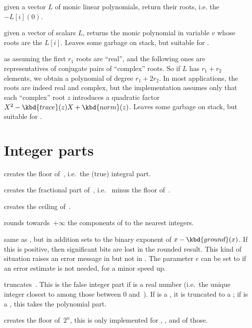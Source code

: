  given a vector $L$ of monic linear
polynomials, return their roots, i.e. the $- L[i](0)$.

 given a vector of scalars $L$,
returns the monic polynomial in variable $v$ whose roots are the $L[i]$.
Leaves some garbage on stack, but suitable for .

 as 
assuming the first $r_1$ roots are ``real'', and the following ones are
representatives of conjugate pairs of ``complex'' roots. So if $L$ has $r_1 +
r_2$ elements, we obtain a polynomial of degree $r_1 + 2r_2$. In most
applications, the roots are indeed real and complex, but the implementation
assumes only that each ``complex'' root $z$ introduces a quadratic
factor $X^2 - \kbd{trace}(z) X + \kbd{norm}(z)$.
Leaves some garbage on stack, but suitable for .

\section{Integer parts}

 creates the floor of~, i.e.\ the (true)
integral part.

 creates the fractional part of~, i.e.\ 
minus the floor of~.

 creates the ceiling of~.

 rounds towards~$+\infty$ the components of 
to the nearest integers.

 same as , but in addition sets
 to the binary exponent of $x - \kbd{ground}(x)$. If this is
positive, then significant bits are lost in the rounded result. This kind of
situation raises an error message in  but not in .
The parameter $e$ can be set to  if an error estimate is not
needed, for a minor speed up.

 truncates~. This is the false integer part
if  is a real number (i.e.~the unique integer closest to  among
those between 0 and~). If  is a , it is truncated
to a ; if  is a , this takes the polynomial part.

 creates the floor of~$2^n$, this is
only implemented for , ,  and  of
those.


